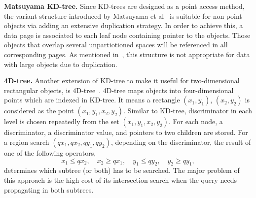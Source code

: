 \documentclass[a4paper,12pt]{article}
\begin{document}
\textbf{Matsuyama KD-tree.} Since KD-trees are designed as a point access method, the variant structure introduced by Matsuyama et al~\cite{matsuyama} is suitable for non-point objects via adding an extensive duplication strategy. In order to achieve this, a data page is associated to each leaf node containing pointer to the objects. Those objects that overlap several unpartiotioned spaces will be referenced in all corresponding pages. As mentioned in~\cite{survey}, this structure is not appropriate for data with large objects due to duplication.

\textbf{4D-tree.} Another extension of KD-tree to make it useful for two-dimensional rectangular objects, is 4D-tree~\cite{4dtree}. 4D-tree maps objects into four-dimensional points which are indexed in KD-tree. It means a rectangle $(x‍‍_1, y_1)$, $(x_2, y_2)$ is considered as the point $(x‍‍_1, y_1, x_2, y_2)$. Similar to KD-tree, discriminator in each level is chosen repeatedly from the set $(x‍‍_1, y_1, x_2, y_2)$. For each node, a discriminator, a discriminator value, and pointers to two children are stored. 
For a region search $(qx_1, qx_2, qy_1, qy_2)$, depending on the discriminator, the result of one of the following operators,
$$x_1 \leq qx_2, \quad x_2 \geq qx_1, \quad y_1 \leq qy_2, \quad y_2 \geq qy_1,$$ 
determines which subtree (or both) has to be searched.
The major problem of this approach is the high cost of its intersection search when the query needs propagating in both subtrees. 
\end{document}
